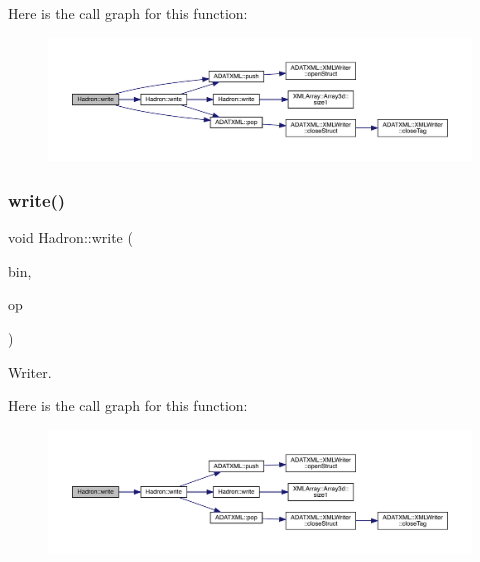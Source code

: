 Here is the call graph for this function\+:
\nopagebreak
\begin{figure}[H]
\begin{center}
\leavevmode
\includegraphics[width=350pt]{d1/daf/namespaceHadron_a005000ac92ae829ca325627dae07fb51_cgraph}
\end{center}
\end{figure}
\mbox{\label{namespaceHadron_a780fbaaa0f7e3ba3453b4994b3ecd7d0}} 
\subsubsection{\texorpdfstring{write()}{write()}\hspace{0.1cm}{\footnotesize\ttfamily [38/95]}}
{\footnotesize\ttfamily void Hadron\+::write (\begin{DoxyParamCaption}\item[{\mbox{\hyperlink{classADATIO_1_1BinaryWriter}{Binary\+Writer}} \&}]{bin,  }\item[{const \mbox{\hyperlink{structHadron_1_1KeySingleHadronQuarkSpin__t}{Key\+Single\+Hadron\+Quark\+Spin\+\_\+t}} \&}]{op }\end{DoxyParamCaption})}



Writer. 

Here is the call graph for this function\+:
\nopagebreak
\begin{figure}[H]
\begin{center}
\leavevmode
\includegraphics[width=350pt]{d1/daf/namespaceHadron_a780fbaaa0f7e3ba3453b4994b3ecd7d0_cgraph}
\end{center}
\end{figure}
\mbox{\label{namespaceHadron_aeeb688cdcca0a8494272d68cf2f15481}} 
